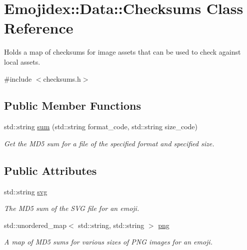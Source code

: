 \hypertarget{classEmojidex_1_1Data_1_1Checksums}{}\section{Emojidex\+:\+:Data\+:\+:Checksums Class Reference}
\label{classEmojidex_1_1Data_1_1Checksums}


Holds a map of checksums for image assets that can be used to check against local assets.  




{\ttfamily \#include $<$checksums.\+h$>$}

\subsection*{Public Member Functions}
\begin{DoxyCompactItemize}
\item 
std\+::string \hyperlink{classEmojidex_1_1Data_1_1Checksums_ae8a65b3fc9c2d9fb40650c09fbbb8eca}{sum} (std\+::string format\+\_\+code, std\+::string size\+\_\+code)
\begin{DoxyCompactList}\small\item\em Get the M\+D5 sum for a file of the specified format and specified size. \end{DoxyCompactList}\end{DoxyCompactItemize}
\subsection*{Public Attributes}
\begin{DoxyCompactItemize}
\item 
std\+::string \hyperlink{classEmojidex_1_1Data_1_1Checksums_a2efd7301a746504a9227cb940a66493f}{svg}\hypertarget{classEmojidex_1_1Data_1_1Checksums_a2efd7301a746504a9227cb940a66493f}{}\label{classEmojidex_1_1Data_1_1Checksums_a2efd7301a746504a9227cb940a66493f}

\begin{DoxyCompactList}\small\item\em The M\+D5 sum of the S\+VG file for an emoji. \end{DoxyCompactList}\item 
std\+::unordered\+\_\+map$<$ std\+::string, std\+::string $>$ \hyperlink{classEmojidex_1_1Data_1_1Checksums_a3caf0bf70d315f74fb027e1f4b880500}{png}\hypertarget{classEmojidex_1_1Data_1_1Checksums_a3caf0bf70d315f74fb027e1f4b880500}{}\label{classEmojidex_1_1Data_1_1Checksums_a3caf0bf70d315f74fb027e1f4b880500}

\begin{DoxyCompactList}\small\item\em A map of M\+D5 sums for various sizes of P\+NG images for an emoji. \end{DoxyCompactList}\end{DoxyCompactItemize}


